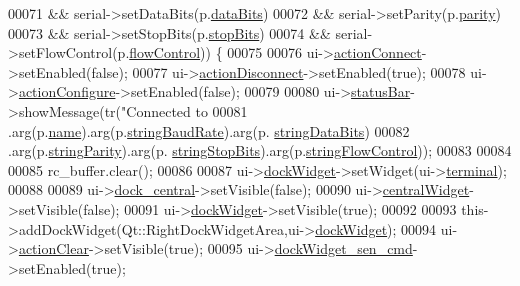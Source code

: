 \begin{DoxyCode}
00071                 && serial->setDataBits(p.\hyperlink{a00075_a7dcd85d028a09508cb4567cf631b40e9}{dataBits})
00072                 && serial->setParity(p.\hyperlink{a00075_ae08a00aa2e45218dade9046e3624cce7}{parity})
00073                 && serial->setStopBits(p.\hyperlink{a00075_ab88ff384f7c1127bcbe2dd97b49696a4}{stopBits})
00074                 && serial->setFlowControl(p.\hyperlink{a00075_aa962a6e7dbb8338af154305e4ff46cfc}{flowControl})) \{
00075 
00076             ui->\hyperlink{a00080_aa0785566311fc48271690fb68b1d4c5f}{actionConnect}->setEnabled(\textcolor{keyword}{false});
00077             ui->\hyperlink{a00080_a8a16b3aef75b279eaaa887152d2f746b}{actionDisconnect}->setEnabled(\textcolor{keyword}{true});
00078             ui->\hyperlink{a00080_a3860abde3cfd3f6170e28fddde73f11e}{actionConfigure}->setEnabled(\textcolor{keyword}{false});
00079 
00080             ui->\hyperlink{a00080_a50fa481337604bcc8bf68de18ab16ecd}{statusBar}->showMessage(tr(\textcolor{stringliteral}{"Connected to %
00081                                        .arg(p.\hyperlink{a00075_a973c8cfb942a512f34fc4227c0caa6dd}{name}).arg(p.\hyperlink{a00075_a54e9d461f783386f314bc24b96665e53}{stringBaudRate}).arg(p.
      \hyperlink{a00075_ab589b733b78af17744ab75067bfce051}{stringDataBits})
00082                                        .arg(p.\hyperlink{a00075_aa2c662b2fb315f038e827d63d83b059b}{stringParity}).arg(p.
      \hyperlink{a00075_abde3c8410f779688ce6c2fcbbbb84f10}{stringStopBits}).arg(p.\hyperlink{a00075_a1b0a388ec5059bd2628acf9b7728f2f3}{stringFlowControl}));
00083 
00084 
00085            rc\_buffer.clear();
00086 
00087            ui->\hyperlink{a00080_ac8a083c4b66fb317a9b538409ce412e2}{dockWidget}->setWidget(ui->\hyperlink{a00080_aae71c46ea4546df5994735dee573b2dd}{terminal});
00088 
00089            ui->\hyperlink{a00080_a19105d0d919fa33b5f29f7677bbab054}{dock\_central}->setVisible(\textcolor{keyword}{false});
00090            ui->\hyperlink{a00080_a30075506c2116c3ed4ff25e07ae75f81}{centralWidget}->setVisible(\textcolor{keyword}{false});
00091            ui->\hyperlink{a00080_ac8a083c4b66fb317a9b538409ce412e2}{dockWidget}->setVisible(\textcolor{keyword}{true});
00092 
00093            this->addDockWidget(Qt::RightDockWidgetArea,ui->\hyperlink{a00080_ac8a083c4b66fb317a9b538409ce412e2}{dockWidget});
00094            ui->\hyperlink{a00080_ac8539dcd87955047877cb256aff60453}{actionClear}->setVisible(\textcolor{keyword}{true});
00095            ui->\hyperlink{a00080_a9eb86a5ee396766f0f4a65f2d2bd7688}{dockWidget\_sen\_cmd}->setEnabled(\textcolor{keyword}{true});
}
\end{DoxyCode}
